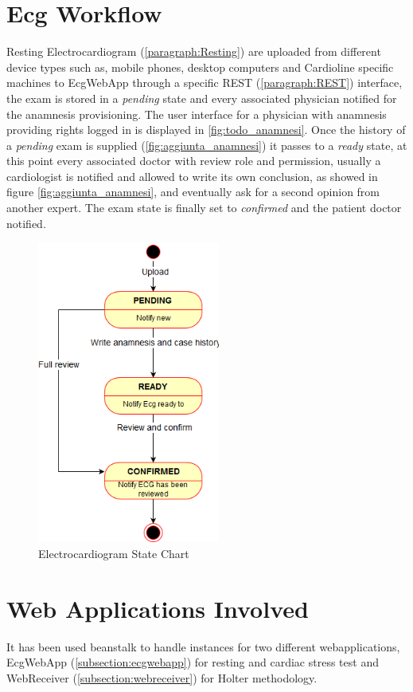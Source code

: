 \section{Ecg Workflow}
Resting Electrocardiogram (\ref{paragraph:Resting}) are uploaded from different device types such as, mobile phones, desktop computers and Cardioline specific machines to EcgWebApp through a specific REST (\ref{paragraph:REST}) interface, the exam is stored in a \textit{pending} state and every associated physician notified for the anamnesis provisioning.
The user interface for a physician with anamnesis providing rights logged in is displayed in \ref{fig:todo_anamnesi}.
Once the history of a \textit{pending} exam is supplied (\ref{fig:aggiunta_anamnesi}) it passes to a \textit{ready} state, at this point every associated doctor with review role and permission, usually a cardiologist is notified and allowed to write its own conclusion, as showed in figure \ref{fig:aggiunta_anamnesi}, and eventually ask for a second opinion from another expert. The exam state is finally set to \textit{confirmed} and the patient doctor notified.
\begin{figure}[h] %
    \centering
    \includegraphics[width=6cm]{img/ECGstatechart}
    \caption{Electrocardiogram State Chart}
    \label{fig:ECGstatechart}
\end{figure}

\section{Web Applications Involved}
It has been used beanstalk to handle instances for two different webapplications, EcgWebApp (\ref{subsection:ecgwebapp}) for resting and cardiac stress test and WebReceiver (\ref{subsection:webreceiver}) for Holter methodology.
